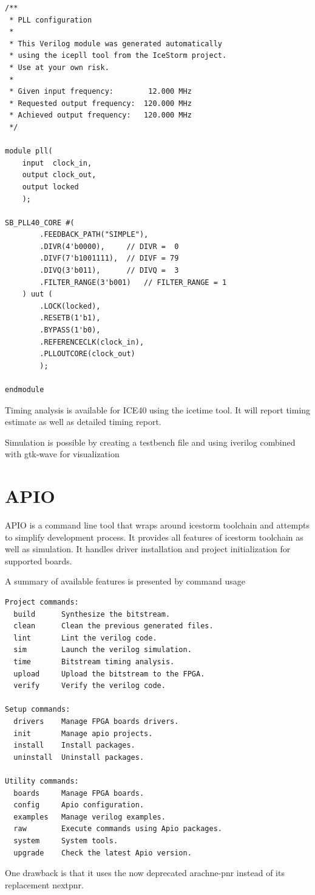 \begin{tcolorbox}
\begin{verbatim}
/**
 * PLL configuration
 *
 * This Verilog module was generated automatically
 * using the icepll tool from the IceStorm project.
 * Use at your own risk.
 *
 * Given input frequency:        12.000 MHz
 * Requested output frequency:  120.000 MHz
 * Achieved output frequency:   120.000 MHz
 */

module pll(
	input  clock_in,
	output clock_out,
	output locked
	);

SB_PLL40_CORE #(
		.FEEDBACK_PATH("SIMPLE"),
		.DIVR(4'b0000),		// DIVR =  0
		.DIVF(7'b1001111),	// DIVF = 79
		.DIVQ(3'b011),		// DIVQ =  3
		.FILTER_RANGE(3'b001)	// FILTER_RANGE = 1
	) uut (
		.LOCK(locked),
		.RESETB(1'b1),
		.BYPASS(1'b0),
		.REFERENCECLK(clock_in),
		.PLLOUTCORE(clock_out)
		);

endmodule

\end{verbatim}
\end{tcolorbox}

Timing analysis is available for ICE40 using the icetime tool. It will report timing estimate as well as detailed timing report.

Simulation is possible by creating a testbench file and using iverilog combined with gtk-wave for visualization



\section{APIO}
APIO is a command line tool that wraps around icestorm toolchain and attempts to simplify development process. It provides all features of icestorm toolchain as well as simulation. It handles driver installation and project initialization for supported boards.

A summary of available features is presented by command usage
\begin{tcolorbox}
\begin{verbatim}
Project commands:
  build      Synthesize the bitstream.
  clean      Clean the previous generated files.
  lint       Lint the verilog code.
  sim        Launch the verilog simulation.
  time       Bitstream timing analysis.
  upload     Upload the bitstream to the FPGA.
  verify     Verify the verilog code.

Setup commands:
  drivers    Manage FPGA boards drivers.
  init       Manage apio projects.
  install    Install packages.
  uninstall  Uninstall packages.

Utility commands:
  boards     Manage FPGA boards.
  config     Apio configuration.
  examples   Manage verilog examples.
  raw        Execute commands using Apio packages.
  system     System tools.
  upgrade    Check the latest Apio version.
\end{verbatim}
\end{tcolorbox}
One drawback is that it uses the now deprecated arachne-pnr instead of its replacement nextpnr.

